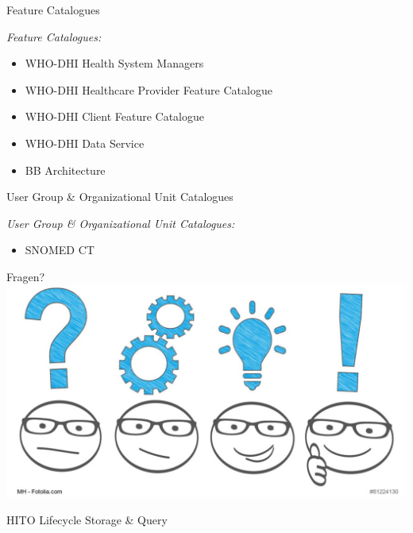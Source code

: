 \documentclass[aspectratio=1610,12pt]{beamer}
\begin{document}
\begin{frame}{Feature Catalogues}
\begin{spacing}{1.5}
  \emph{Feature Catalogues:}
  \begin{itemize}
    \item WHO-DHI Health System Managers
    \item WHO-DHI Healthcare Provider Feature Catalogue
    \item WHO-DHI Client Feature Catalogue
    \item WHO-DHI Data Service
    \item BB Architecture
  \end{itemize}
  \end{spacing}
\end{frame}

\begin{frame}{User Group \& Organizational Unit Catalogues}
\begin{spacing}{1.5}
  \emph{User Group \& Organizational Unit Catalogues:}
  \begin{itemize}
    \item SNOMED CT
  \end{itemize}
  \end{spacing}
\end{frame}

\begin{frame}{Fragen?}
  \centering
  \vspace{-0.5cm}
  \includegraphics[width=\textwidth]{img/fragen.png}
\end{frame}

\begin{frame}{HITO Lifecycle Storage \& Query}
 \centering
  \vspace{-0.5cm}
\end{frame}
\end{document}
